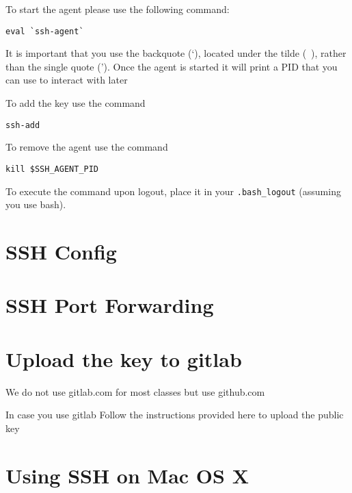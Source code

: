 To start the agent please use the following command:

\begin{verbatim}
eval `ssh-agent`
\end{verbatim}

It is important that you use the backquote (`), located under the
tilde (~), rather than the single quote ('). Once the agent is started
it will print a PID that you can use to interact with later

To add the key use the command

\begin{verbatim}
ssh-add
\end{verbatim}

To remove the agent use the command

\begin{verbatim}
kill $SSH_AGENT_PID
\end{verbatim}

To execute the command upon logout, place it in your 
\verb|.bash_logout| (assuming you use bash).


\section{SSH Config}


\section{SSH Port Forwarding}


\section{Upload the key to gitlab}\label{upload-the-key-to-gitlab}

\begin{IU}
We do not use gitlab.com for most classes but use github.com
\end{IU}

In case you use gitlab  Follow the instructions provided here to
upload the public key


\section{Using SSH on Mac OS X}\label{using-ssh-on-mac-os-x}


